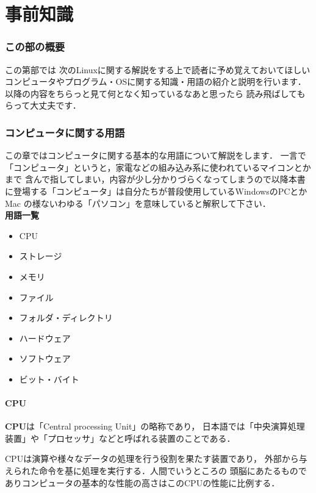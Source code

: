 \documentclass[autodetect-engine,dvi=dvipdfmx,ja=standard,a4j]{bxjsarticle}
\begin{document}
\part{事前知識} \label{foundation}

\section{この部の概要} 
この第\ref{foundation}部では
次のLinuxに関する解説をする上で読者に予め覚えておいてほしい
コンピュータやプログラム・OSに関する知識・用語の紹介と説明を行います．
以降の内容をちらっと見て何となく知っているなあと思ったら
読み飛ばしてもらって大丈夫です．

\section{コンピュータに関する用語} \label{sec:computer-knowledge}
この章ではコンピュータに関する基本的な用語について解説をします．
一言で「コンピュータ」というと，家電などの組み込み系に使われているマイコンとかまで
含んで指してしまい，内容が少し分かりづらくなってしまうので以降本書に登場する「コンピュータ」は自分たちが普段使用しているWindowsのPCとかMac
の様ないわゆる「パソコン」を意味していると解釈して下さい．\\

\textbf{用語一覧}
\begin{itemize}
    \item CPU
    \item ストレージ
    \item メモリ
    \item ファイル
    \item フォルダ・ディレクトリ
    \item ハードウェア
    \item ソフトウェア
    \item ビット・バイト
\end{itemize}

\subsection{CPU}
\textbf{CPU}は「Central processing Unit」の略称であり，
日本語では「中央演算処理装置」や「プロセッサ」などと呼ばれる装置のことである．

CPUは演算や様々なデータの処理を行う役割を果たす装置であり，
外部から与えられた命令を基に処理を実行する．人間でいうところの
頭脳にあたるものでありコンピュータの基本的な性能の高さはこのCPUの性能に比例する．
\end{document}
